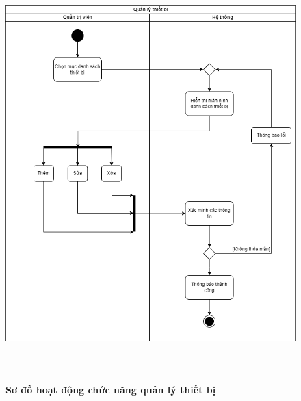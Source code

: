   \begin{figure}[H]
    \centering
    \includegraphics[width=13.5cm,height=16cm]{Images/acitivity/activity_manage_device.png}
    \caption[Sơ đồ hoạt động chức năng quản lý thiết bị]{\bfseries \fontsize{12pt}{0pt}
    \selectfont Sơ đồ hoạt động chức năng quản lý thiết bị}
    \label{activity_device_management} %
  \end{figure}


